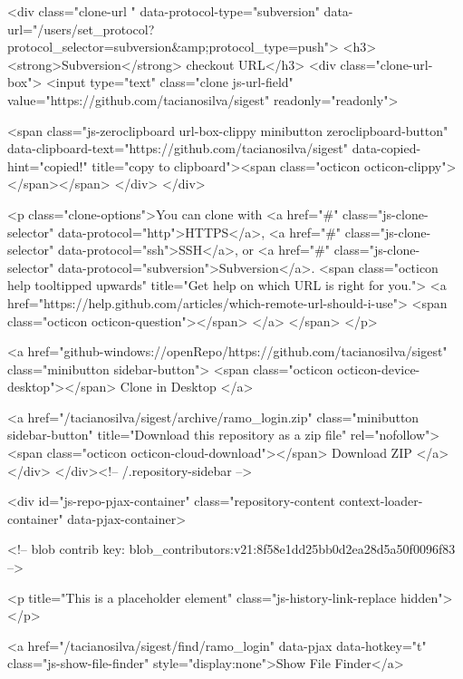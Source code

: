   

<div class="clone-url "
  data-protocol-type="subversion"
  data-url="/users/set_protocol?protocol_selector=subversion&amp;protocol_type=push">
  <h3><strong>Subversion</strong> checkout URL</h3>
  <div class="clone-url-box">
    <input type="text" class="clone js-url-field"
           value="https://github.com/tacianosilva/sigest" readonly="readonly">

    <span class="js-zeroclipboard url-box-clippy minibutton zeroclipboard-button" data-clipboard-text="https://github.com/tacianosilva/sigest" data-copied-hint="copied!" title="copy to clipboard"><span class="octicon octicon-clippy"></span></span>
  </div>
</div>


<p class="clone-options">You can clone with
      <a href="#" class="js-clone-selector" data-protocol="http">HTTPS</a>,
      <a href="#" class="js-clone-selector" data-protocol="ssh">SSH</a>,
      or <a href="#" class="js-clone-selector" data-protocol="subversion">Subversion</a>.
  <span class="octicon help tooltipped upwards" title="Get help on which URL is right for you.">
    <a href="https://help.github.com/articles/which-remote-url-should-i-use">
    <span class="octicon octicon-question"></span>
    </a>
  </span>
</p>


  <a href="github-windows://openRepo/https://github.com/tacianosilva/sigest" class="minibutton sidebar-button">
    <span class="octicon octicon-device-desktop"></span>
    Clone in Desktop
  </a>

              <a href="/tacianosilva/sigest/archive/ramo_login.zip"
                 class="minibutton sidebar-button"
                 title="Download this repository as a zip file"
                 rel="nofollow">
                <span class="octicon octicon-cloud-download"></span>
                Download ZIP
              </a>
            </div>
        </div><!-- /.repository-sidebar -->

        <div id="js-repo-pjax-container" class="repository-content context-loader-container" data-pjax-container>
          


<!-- blob contrib key: blob_contributors:v21:8f58e1dd25bb0d2ea28d5a50f0096f83 -->

<p title="This is a placeholder element" class="js-history-link-replace hidden"></p>

<a href="/tacianosilva/sigest/find/ramo_login" data-pjax data-hotkey="t" class="js-show-file-finder" style="display:none">Show File Finder</a>

